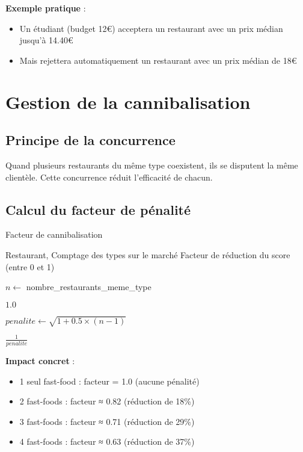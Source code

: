 \documentclass[12pt,a4paper]{article}
\begin{document}
\textbf{Exemple pratique} :
\begin{itemize}
    \item Un étudiant (budget 12€) acceptera un restaurant avec un prix médian jusqu'à 14.40€
    \item Mais rejettera automatiquement un restaurant avec un prix médian de 18€
\end{itemize}

\section{Gestion de la cannibalisation}

\subsection{Principe de la concurrence}

Quand plusieurs restaurants du même type coexistent, ils se disputent la même clientèle. Cette concurrence réduit l'efficacité de chacun.

\subsection{Calcul du facteur de pénalité}

\begin{algorithm}[H]
\caption{Facteur de cannibalisation}
\begin{algorithmic}[1]
\REQUIRE Restaurant, Comptage des types sur le marché
\ENSURE Facteur de réduction du score (entre 0 et 1)

\STATE $n \leftarrow$ nombre\_restaurants\_meme\_type

    \RETURN $1.0$ 
\ENDIF

\STATE $penalite \leftarrow \sqrt{1 + 0.5 \times (n-1)}$

\RETURN $\frac{1}{penalite}$
\end{algorithmic}
\end{algorithm}

\textbf{Impact concret} :
\begin{itemize}
    \item 1 seul fast-food : facteur = 1.0 (aucune pénalité)
    \item 2 fast-foods : facteur ≈ 0.82 (réduction de 18\%)
    \item 3 fast-foods : facteur ≈ 0.71 (réduction de 29\%)
    \item 4 fast-foods : facteur ≈ 0.63 (réduction de 37\%)
\end{itemize}
\end{document}
